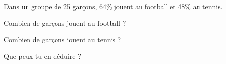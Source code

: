 Dans un groupe de 25 garçons, 64\% jouent au football et 48\% au tennis.
\begin{myenumerate}
\item Combien de garçons jouent au football ?
\item Combien de garçons jouent au tennis ?
\item Que peux-tu en déduire ?
\end{myenumerate}